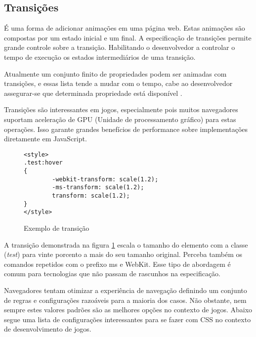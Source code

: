 
\subsection{Transições}

É uma forma de adicionar animações em uma página web.
Estas animações são compostas por um estado inicial e um
final. A especificação de transições permite grande controle
sobre a transição. Habilitando o desenvolvedor a controlar
o tempo de execução os estados intermediários de uma transição.

Atualmente um conjunto finito de propriedades podem ser animadas
com transições, e essas lista tende a mudar com o tempo, cabe ao
desenvolvedor assegurar-se que determinada propriedade está disponível
\autocite{mdnTransitions}.

Transições são interessantes em jogos, especialmente pois muitos
navegadores suportam aceleração de GPU (Unidade de processamento
gráfico) para estas operações. Isso garante grandes benefícios de
performance sobre implementações diretamente em JavaScript.

\begin{figure}
\centering
\begin{verbatim}
<style>
.test:hover
{
        -webkit-transform: scale(1.2);
        -ms-transform: scale(1.2);
        transform: scale(1.2);
}
</style>
\end{verbatim}
\caption{Exemplo de transição}
\label{fig:CSSTransition}
\end{figure}

A transição demonstrada na figura \ref{fig:CSSTransition} escala o
tamanho do elemento com a classe (\textit{test}) para vinte porcento a
mais do seu tamanho original. Perceba também os comandos repetidos com
o prefixo ms e WebKit. Esse tipo de abordagem é comum para tecnologias
que não passam de rascunhos na especificação.

Navegadores tentam otimizar a experiência de navegação definindo
um conjunto de regras e configurações razoáveis para a maioria dos
casos. Não obstante, nem sempre estes valores padrões são as melhores
opções no contexto de jogos. Abaixo segue uma lista de configurações
interessantes para se fazer com CSS no contexto de desenvolvimento de
jogos.


